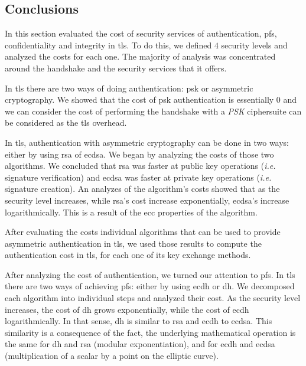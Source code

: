 \documentclass{llncs}
\begin{document}
\subsection{Conclusions} \label{sec:ss-cost-conclusions}

In this section evaluated the cost of security services of authentication, \gls{pfs}, confidentiality and integrity
in \gls{tls}. To do this, we defined $4$ security levels and analyzed the costs for each one. The majority of
analysis was concentrated around the handshake and the security services that it offers.

In \gls{tls} there are two ways of doing authentication: \gls{psk} or asymmetric cryptography. We showed that the
cost of \gls{psk} authentication is essentially $0$ and we can consider the cost of performing the 
handshake with a \textit{PSK} ciphersuite can be considered as the \gls{tls} overhead.

In \gls{tls}, authentication with asymmetric cryptography can be done in two ways: either by using \gls{rsa}
of \gls{ecdsa}. We began by analyzing the costs of those two algorithms. We concluded that \gls{rsa} was
faster at public key operations (\textit{i.e.} signature verification) and \gls{ecdsa} was faster at private key
operations (\textit{i.e.} signature creation). An analyzes of the algorithm's costs showed that as the security level
increases, while \gls{rsa}'s cost increase exponentially, \gls{ecdsa}'s increase logarithmically. This is a result of the
\gls{ecc} properties of the algorithm.

After evaluating the costs individual algorithms that can be used to provide asymmetric authentication in \gls{tls}, we
used those results to compute the authentication cost in \gls{tls}, for each one of its key exchange methods.

After analyzing the cost of authentication, we turned our attention to \gls{pfs}. In \gls{tls} there are two ways
of achieving \gls{pfs}: either by using \gls{ecdh} or \gls{dh}. We decomposed each algorithm into individual steps
and analyzed their cost. As the security level increases, the cost of \gls{dh} grows exponentially, while the cost
of \gls{ecdh} logarithmically. In that sense, \gls{dh} is similar to \gls{rsa} and \gls{ecdh} to \gls{ecdsa}.
This similarity is a consequence of the fact, the underlying mathematical operation is the same for \gls{dh} and
\gls{rsa} (modular exponentiation), and for \gls{ecdh} and \gls{ecdsa} (multiplication of a scalar by a point on 
the elliptic curve).
\end{document}
